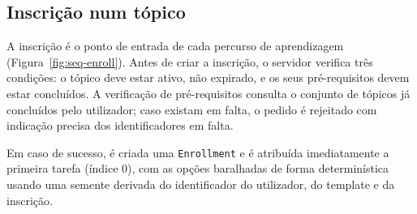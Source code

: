 \subsection{Inscri\c{c}\~ao num t\'opico}
\label{ssec:seq-enroll}

A inscri\c{c}\~ao \'e o ponto de entrada de cada percurso de aprendizagem
(Figura~\ref{fig:seq-enroll}). Antes de criar a inscri\c{c}\~ao, o servidor
verifica tr\^es condi\c{c}\~oes: o t\'opico deve estar ativo, n\~ao expirado,
e os seus pr\'e-requisitos devem estar conclu\'idos. A verifica\c{c}\~ao de
pr\'e-requisitos consulta o conjunto de t\'opicos j\'a conclu\'idos pelo
utilizador; caso existam em falta, o pedido \'e rejeitado com indica\c{c}\~ao
precisa dos identificadores em falta.

Em caso de sucesso, \'e criada uma \texttt{Enrollment} e \'e atribu\'ida
imediatamente a primeira tarefa (\'indice 0), com as op\c{c}\~oes baralhadas
de forma determin\'istica usando uma semente derivada do identificador do
utilizador, do template e da inscri\c{c}\~ao.

